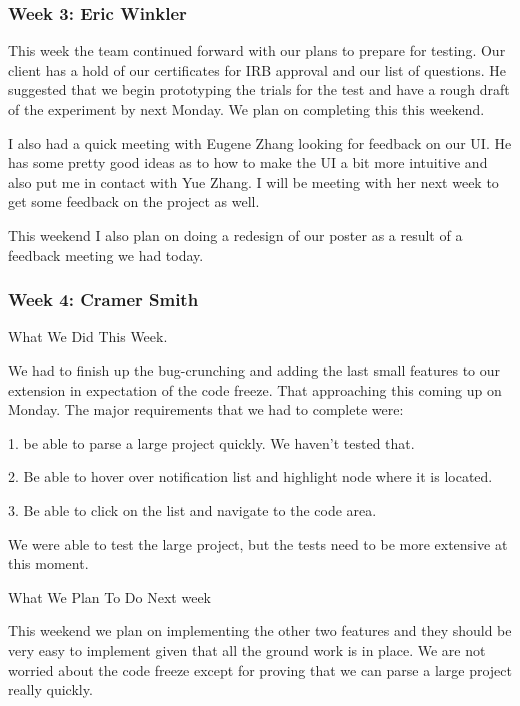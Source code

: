  \subsubsection{Week 3: Eric Winkler}

This week the team continued forward with our plans to prepare for testing. Our client has a hold of our certificates for IRB approval and our list of questions. He suggested that we begin prototyping the trials for the test and have a rough draft of the experiment by next Monday. We plan on completing this this weekend. 



I also had a quick meeting with Eugene Zhang looking for feedback on our UI. He has some pretty good ideas as to how to make the UI a bit more intuitive and also put me in contact with Yue Zhang. I will be meeting with her next week to get some feedback on the project as well.



This weekend I also plan on doing a redesign of our poster as a result of a feedback meeting we had today. \\ 

 \subsubsection{Week 4: Cramer Smith}

What We Did This Week.



We had to finish up the bug-crunching and adding the last small features to our extension in expectation of the code freeze. That approaching this coming up on Monday. The major requirements that we had to complete were:



1. be able to parse a large project quickly. We haven't tested that. 

2. Be able to hover over notification list and highlight node where it is located.

3. Be able to click on the list and navigate to the code area.



We were able to test the large project, but the tests need to be more extensive at this moment. 



What We Plan To Do Next week



This weekend we plan on implementing the other two features and they should be very easy to implement given that all the ground work is in place. We are not worried about the code freeze except for proving that we can parse a large project really quickly.  \\ 

